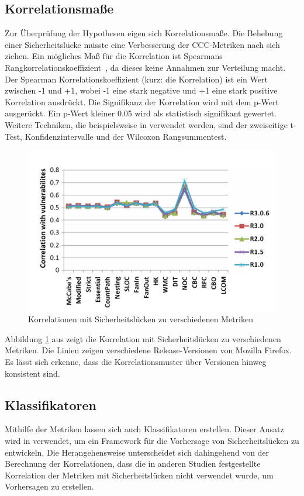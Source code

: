 \subsection{Korrelationsmaße}
Zur Überprüfung der Hypothesen eigen sich Korrelationsmaße.
Die Behebung einer Sicherheitslücke müsste eine Verbesserung der CCC-Metriken nach sich ziehen.
Ein mögliches Maß für die Korrelation ist Spearmans Rangkorrelationskoeffizient~\cite{alves_et_al,chowdhury_zulkernine_2010}, da dieses keine Annahmen zur Verteilung macht.
Der Spearman Korrelationskoeffizient (kurz: die Korrelation) ist ein Wert zwischen -1 und +1, wobei -1 eine stark negative und +1 eine stark positive Korrelation ausdrückt.
Die Signifikanz der Korrelation wird mit dem p-Wert ausgerückt.
Ein p-Wert kleiner 0.05 wird als statistisch signifikant gewertet.
Weitere Techniken, die beispielsweise in \cite{alves_et_al} verwendet werden, sind der zweiseitige t-Test, Konfidenzintervalle und der Wilcoxon Rangsummentest.
\begin{figure}
	\includegraphics[width=\textwidth]{img/vulnerability_correlations.png}
	\caption{Korrelationen mit Sicherheitslücken zu verschiedenen Metriken}
	\label{fig:correlations}
\end{figure}
Abbildung \ref{fig:correlations} aus \cite{chowdhury_zulkernine_2009} zeigt die Korrelation mit Sicherheitslücken zu verschiedenen Metriken.
Die Linien zeigen verschiedene Release-Versionen von Mozilla Firefox.
Es lässt sich erkenne, dass die Korrelationsmuster über Versionen hinweg konsistent sind\cite{chowdhury_zulkernine_2009}.

\subsection{Klassifikatoren}
Mithilfe der Metriken lassen sich auch Klassifikatoren erstellen.
Dieser Ansatz wird in \cite{chowdhury_zulkernine_2009} verwendet, um ein Framework für die Vorhersage von Sicherheitslücken zu entwickeln.
Die Herangehensweise unterscheidet sich dahingehend von der Berechnung der Korrelationen, dass die in anderen Studien festgestellte Korrelation der Metriken mit Sicherheitslücken nicht verwendet wurde, um Vorhersagen zu erstellen.

